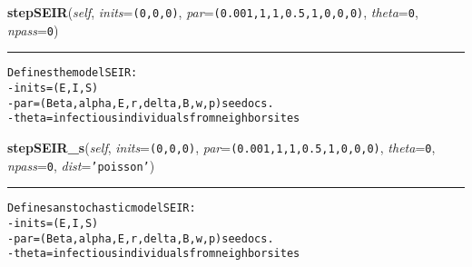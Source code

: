     \vspace{0.5ex}

    \begin{boxedminipage}{\textwidth}

    \raggedright \textbf{stepSEIR}(\textit{self}, \textit{inits}=\texttt{(0,0,0)}, \textit{par}=\texttt{(0.001,1,1,0.5,1,0,0,0)}, \textit{theta}=\texttt{0}, \textit{npass}=\texttt{0})

    \vspace{-1.5ex}

    \rule{\textwidth}{0.5\fboxrule}
\begin{alltt}

Defines the model SEIR:
- inits = (E,I,S)
- par = (Beta, alpha, E,r,delta,B,w,p) see docs.
- theta = infectious individuals from neighbor sites
\end{alltt}

    \vspace{1ex}

    \end{boxedminipage}

    \label{Epigrass:simobj:popmodels:stepSEIR_s}

    \vspace{0.5ex}

    \begin{boxedminipage}{\textwidth}

    \raggedright \textbf{stepSEIR\_s}(\textit{self}, \textit{inits}=\texttt{(0,0,0)}, \textit{par}=\texttt{(0.001,1,1,0.5,1,0,0,0)}, \textit{theta}=\texttt{0}, \textit{npass}=\texttt{0}, \textit{dist}=\texttt{'poisson'})

    \vspace{-1.5ex}

    \rule{\textwidth}{0.5\fboxrule}
\begin{alltt}

Defines an stochastic model SEIR:
- inits = (E,I,S)
- par = (Beta, alpha, E,r,delta,B,w,p) see docs.
- theta = infectious individuals from neighbor sites
\end{alltt}

    \vspace{1ex}

    \end{boxedminipage}

    \label{Epigrass:simobj:popmodels:stepSIpRpS}

